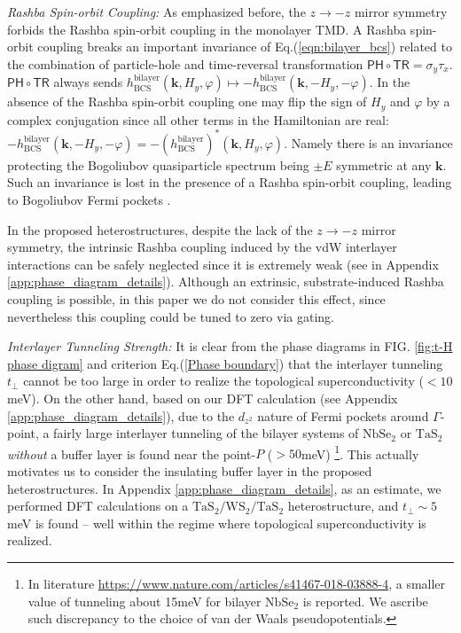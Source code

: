 \vspace{1em}
\emph{Rashba Spin-orbit Coupling:} As emphasized before, the $z\rightarrow-z$ mirror symmetry forbids the Rashba spin-orbit coupling in the monolayer TMD. A Rashba spin-orbit coupling breaks an important invariance of Eq.(\ref{eqn:bilayer_bcs}) related to the combination of particle-hole and time-reversal transformation $\mathsf{PH}\circ\mathsf{TR}=\sigma_y\tau_x$. $\mathsf{PH}\circ\mathsf{TR}$ always sends $h_{\text{BCS}}^{\text{bilayer}}(\bm{k},H_y,\varphi)\mapsto -h_{\text{BCS}}^{\text{bilayer}}(\bm{k},-H_y,-\varphi)$. In the absence of the Rashba spin-orbit coupling one may flip the sign of $H_y$ and $\varphi$ by a complex conjugation since all other terms in the Hamiltonian are real: $-h_{\text{BCS}}^{\text{bilayer}}(\bm{k},-H_y,-\varphi)=-(h_{\text{BCS}}^{\text{bilayer}})^*(\bm{k},H_y,\varphi)$. Namely there is an invariance protecting the Bogoliubov quasiparticle spectrum being $\pm E$ symmetric at any $\bm k$. Such an invariance is lost in the presence of a Rashba spin-orbit coupling, leading to Bogoliubov Fermi pockets \cite{shaffer2020crystalline}. 

In the proposed heterostructures, despite the lack of the $z\rightarrow-z$ mirror symmetry, the intrinsic Rashba coupling induced by the vdW interlayer interactions can be safely neglected since it is extremely weak (see in Appendix \ref{app:phase_diagram_details}). Although an extrinsic, substrate-induced Rashba coupling is possible, in this paper we do not consider this effect, since nevertheless this coupling could be tuned to zero via gating.

\vspace{1em}
\emph{Interlayer Tunneling Strength:} It is clear from the phase diagrams in FIG. \ref{fig:t-H phase digram} and criterion Eq.(\ref{Phase boundary}) that the interlayer tunneling $t_\perp$ cannot be too large in order to realize the topological superconductivity ($<10$meV). On the other hand, based on our DFT calculation (see Appendix \ref{app:phase_diagram_details}), due to the $d_{z^2}$ nature of Fermi pockets around $\Gamma$-point, a fairly large interlayer tunneling of the bilayer systems of $\mathrm{NbSe_2}$ or $\mathrm{TaS_2}$ \emph{without} a buffer layer is found near the point-$P$ ($>50$meV) \footnote{In literature \protect\url{https://www.nature.com/articles/s41467-018-03888-4}, a smaller value of tunneling about 15meV for bilayer $\mathrm{NbSe_2}$ is reported. We ascribe such discrepancy to the choice of van der Waals pseudopotentials.}. This actually motivates us to consider the insulating buffer layer in the proposed heterostructures. In Appendix \ref{app:phase_diagram_details}, as an estimate, we performed DFT calculations on a $\mathrm{TaS_2}/\mathrm{WS_2}/\mathrm{TaS_2}$ heterostructure, and $t_\perp\sim 5$meV is found -- well within the regime where topological superconductivity is realized.

